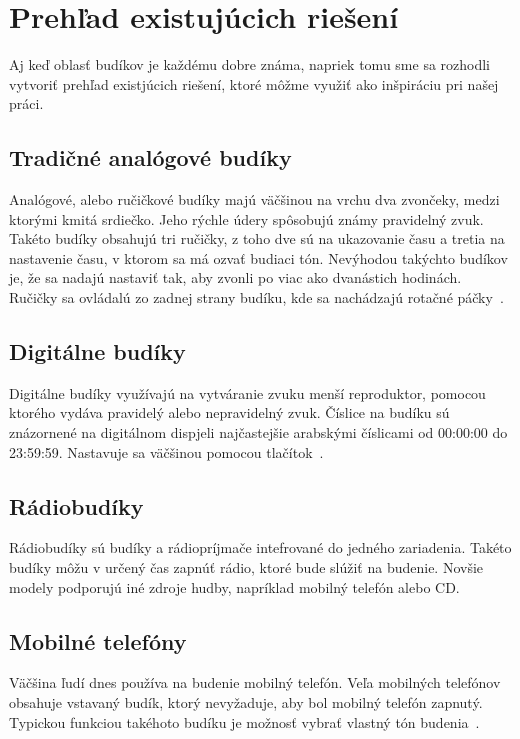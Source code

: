 \chapter{Prehľad existujúcich riešení}
Aj keď oblasť budíkov je každému dobre známa, napriek tomu sme sa rozhodli vytvoriť prehľad existjúcich riešení, ktoré môžme využiť ako inšpiráciu pri našej práci.

\section{Tradičné analógové budíky}
Analógové, alebo ručičkové budíky majú väčšinou na vrchu dva zvončeky, medzi ktorými kmitá srdiečko. Jeho rýchle údery spôsobujú známy pravidelný zvuk. Takéto budíky obsahujú tri ručičky, z toho dve sú na ukazovanie času a tretia na nastavenie času, v ktorom sa má ozvať budiaci tón. Nevýhodou takýchto budíkov je, že sa nadajú nastaviť tak, aby zvonli po viac ako dvanástich hodinách. Ručičky sa ovládalú zo zadnej strany budíku, kde sa nachádzajú rotačné páčky~\cite{hodkin-2015}.

\section{Digitálne budíky}
Digitálne budíky využívajú na vytváranie zvuku menší reproduktor, pomocou ktorého vydáva pravidelý alebo nepravidelný zvuk. Číslice na budíku sú znázornené na digitálnom dispjeli najčastejšie arabskými číslicami od 00:00:00 do 23:59:59. Nastavuje sa väčšinou pomocou tlačítok~\cite{hodkin-2015}.

\section{Rádiobudíky}
Rádiobudíky sú budíky a rádiopríjmače intefrované do jedného zariadenia. Takéto budíky môžu v určený čas zapnúť rádio, ktoré bude slúžiť na budenie. Novšie modely podporujú iné zdroje hudby, napríklad mobilný telefón alebo CD.

\section{Mobilné telefóny}
Väčšina ľudí dnes používa na budenie mobilný telefón.
Veľa mobilných telefónov obsahuje vstavaný budík, ktorý nevyžaduje, aby bol mobilný telefón zapnutý. Typickou funkciou takéhoto budíku je možnosť vybrať vlastný tón budenia~\cite{mb-clock}.
